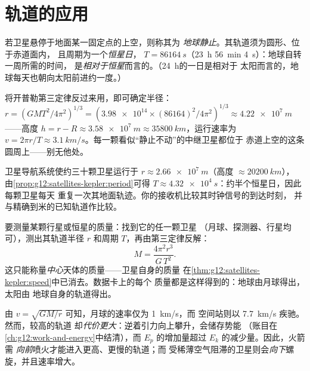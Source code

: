 \section{轨道的应用}

\begin{definition}[地球静止轨道]\label{def:g12:satellites-kepler:geo}
若卫星悬停于地面某一固定点的上空，则称其为
\emph{地球静止}。其轨道须为圆形、位于赤道面内，
且周期为一个\emph{恒星日}，
$T = \qty{86164}{s}$（\qty{23}{h}
\qty{56}{min} \qty{4}{s}）：地球自转一周所需的时间，
是\emph{相对于恒星}而言的。（\qty{24}{h}的一日是相对于
太阳而言的，地球每天也朝向太阳前进约一度。）
\end{definition}

\begin{example}[地球静止轨道的高度]\label{ex:g12:satellites-kepler:geoalt}
将开普勒第三定律反过来用，即可确定半径：
$r = \left(GMT^2/4\pi^2\right)^{1/3} =
\left(\num{3.98e14} \times (\num{86164})^2/4\pi^2\right)^{1/3}
\approx \qty{4.22e7}{m}$——高度 $h = r - R \approx
\qty{3.58e7}{m} \approx \qty{35800}{km}$，运行速率为 $v = 2\pi r/T
\approx \qty{3.1}{km/s}$。每一颗看似“静止不动”的中继卫星都位于
赤道上空的这条圆周上——别无他处。
\end{example}

\begin{example}[卫星导航星座]\label{ex:g12:satellites-kepler:gps}
卫星导航系统使约三十颗卫星运行于
$r \approx \qty{2.66e7}{m}$（高度 $\approx \qty{20200}{km}$），
由\cref{prop:g12:satellites-kepler:period}可得 $T \approx
\qty{4.32e4}{s}$：约半个恒星日，因此每颗卫星每天
重复一次其地面轨迹。你的接收机比较其时钟信号的到达时刻，
并与精确到米的已知轨道作比较。
\end{example}

\begin{method}[由卫星称量天体的质量]\label{met:g12:satellites-kepler:weigh}
%
要测量某颗行星或恒星的质量：找到它的任一颗卫星
（月球、探测器、行星均可），测出其轨道半径 $r$ 和周期
$T$，再由第三定律反解：
\[ M = \frac{4\pi^2 r^3}{G\,T^2}. \]
这只能称量\emph{中心}天体的质量——卫星自身的质量
在\cref{thm:g12:satellites-kepler:speed}中已消去。数据卡上的每个
质量都是这样得到的：地球由月球得出，太阳由
地球自身的轨道得出。
\end{method}

\begin{remark}\label{rem:g12:satellites-kepler:energy}
由 $v = \sqrt{GM/r}$ 可知，月球的速率仅为 \qty{1}{km/s}，而
空间站则以 \qty{7.7}{km/s} 疾驰。然而，较高的轨道
却\emph{代价更大}：逆着引力向上攀升，会储存势能
（账目在\cref{ch:g12:work-and-energy}中结清），而
$E_p$ 的增加量超过 $E_k$ 的减少量。因此，火箭需
\emph{向前}喷火才能进入更高、更慢的轨道；而
受稀薄空气阻滞的卫星则会\emph{向下}螺旋，并且速率增大。
\end{remark}

